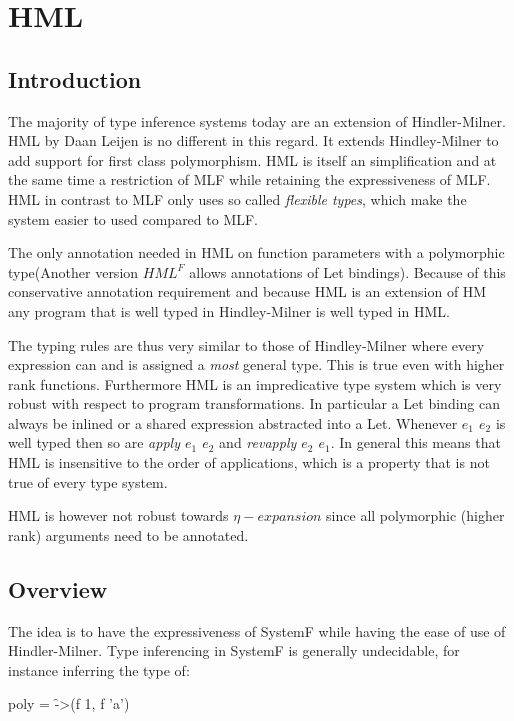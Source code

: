 \chapter{HML}
\label{HML}
\section{Introduction}
The majority of type inference systems today are an extension of Hindler-Milner\cite{HM}. HML\cite{HML} by Daan Leijen is no different in this regard. It extends Hindley-Milner to add support for first class polymorphism. HML is itself an simplification and at the same time a restriction of MLF\cite{MLF} while retaining the expressiveness of MLF. HML in contrast to MLF only uses so called \emph{flexible types}, which make the system easier to used compared to MLF.

The only annotation needed in HML on function parameters with a polymorphic type(Another version $HML^F$ allows annotations of Let bindings). Because of this conservative annotation requirement and because HML is an extension of HM any program that is well typed in Hindley-Milner is well typed in HML.

The typing rules are thus very similar to those of Hindley-Milner where every expression can and is assigned a \emph{most} general type. This is true even with higher rank functions. Furthermore HML is an impredicative type system which is very robust with respect to program transformations. In particular a Let binding can always be inlined or a shared expression abstracted into a Let. Whenever \emph{$e_1$ $e_2$} is well typed then so are \emph{apply $e_1$ $e_2$} and \emph{revapply $e_2$ $e_1$}. In general this means that HML is insensitive to the order of applications, which is a property that is not true of every type system.

HML is however not robust towards $\eta-expansion$ since all polymorphic (higher rank) arguments need to be annotated.

\section{Overview}
The idea is to have the expressiveness of SystemF while having the ease of use of Hindler-Milner. Type inferencing in SystemF is generally undecidable, for instance inferring the type of:

\begin{code}
poly = \f->(f 1, f 'a')
\end{code}

